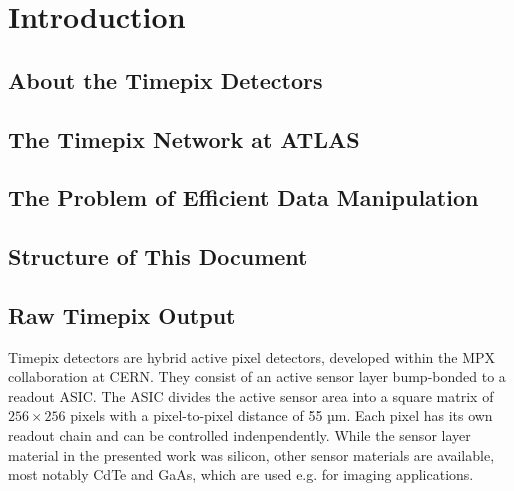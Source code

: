 \chapter{Introduction}

\section{About the Timepix Detectors}
\todo

\section{The Timepix Network at ATLAS}
\todo

\section{The Problem of Efficient Data Manipulation}
\todo

\section{Structure of This Document}
\todo





\section{Raw Timepix Output}
Timepix detectors are hybrid active pixel detectors, developed within the MPX collaboration at CERN. They consist of an active sensor layer bump-bonded to a readout ASIC. The ASIC divides the active sensor area into a square matrix of $256 \times 256$ pixels with a pixel-to-pixel distance of 55 µm. Each pixel has its own readout chain and can be controlled indenpendently. While the sensor layer material in the presented work was silicon, other sensor materials are available, most notably CdTe and GaAs, which are used e.g. for imaging applications.

